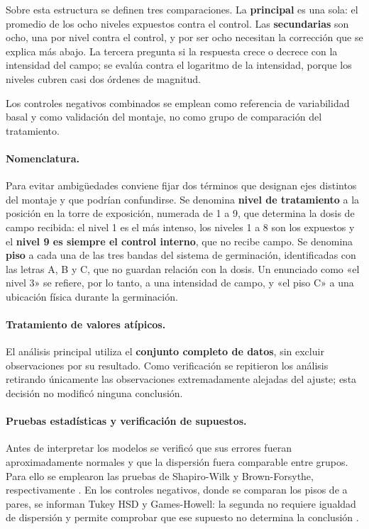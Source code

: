 Sobre esta estructura se definen tres comparaciones. La \textbf{principal} es una sola: el promedio de los ocho niveles expuestos contra el control. Las \textbf{secundarias} son ocho, una por nivel contra el control, y por ser ocho necesitan la corrección que se explica más abajo. La tercera pregunta si la respuesta crece o decrece con la intensidad del campo; se evalúa contra el logaritmo de la intensidad, porque los niveles cubren casi dos órdenes de magnitud.

Los controles negativos combinados se emplean como referencia de variabilidad basal y como validación del montaje, no como grupo de comparación del tratamiento.

\paragraph{Nomenclatura.}

Para evitar ambigüedades conviene fijar dos términos que designan ejes distintos del montaje y que podrían confundirse. Se denomina \textbf{nivel de tratamiento} a la posición en la torre de exposición, numerada de 1 a 9, que determina la dosis de campo recibida: el nivel 1 es el más intenso, los niveles 1 a 8 son los expuestos y el \textbf{nivel 9 es siempre el control interno}, que no recibe campo. Se denomina \textbf{piso} a cada una de las tres bandas del sistema de germinación, identificadas con las letras A, B y C, que no guardan relación con la dosis. Un enunciado como «el nivel 3» se refiere, por lo tanto, a una intensidad de campo, y «el piso C» a una ubicación física durante la germinación.

\paragraph{Tratamiento de valores atípicos.}

El análisis principal utiliza el \textbf{conjunto completo de datos}, sin excluir observaciones por su resultado. Como verificación se repitieron los análisis retirando únicamente las observaciones extremadamente alejadas del ajuste; esta decisión no modificó ninguna conclusión.

\paragraph{Pruebas estadísticas y verificación de supuestos.}

Antes de interpretar los modelos se verificó que sus errores fueran aproximadamente normales y que la dispersión fuera comparable entre grupos. Para ello se emplearon las pruebas de Shapiro-Wilk y Brown-Forsythe, respectivamente \cite{shapiro_wilk_1965,levene_1960,brown_forsythe_1974}. En los controles negativos, donde se comparan los pisos de a pares, se informan Tukey HSD y Games-Howell: la segunda no requiere igualdad de dispersión y permite comprobar que ese supuesto no determina la conclusión \cite{tukey_1949,games_howell_1976}.

